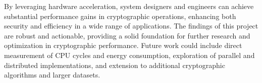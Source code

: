 \documentclass[12pt,a4paper]{article}
\begin{document}
By leveraging hardware acceleration, system designers and engineers can achieve substantial performance gains in cryptographic operations, enhancing both security and efficiency in a wide range of applications. The findings of this project are robust and actionable, providing a solid foundation for further research and optimization in cryptographic performance. Future work could include direct measurement of CPU cycles and energy consumption, exploration of parallel and distributed implementations, and extension to additional cryptographic algorithms and larger datasets.
\end{document}
